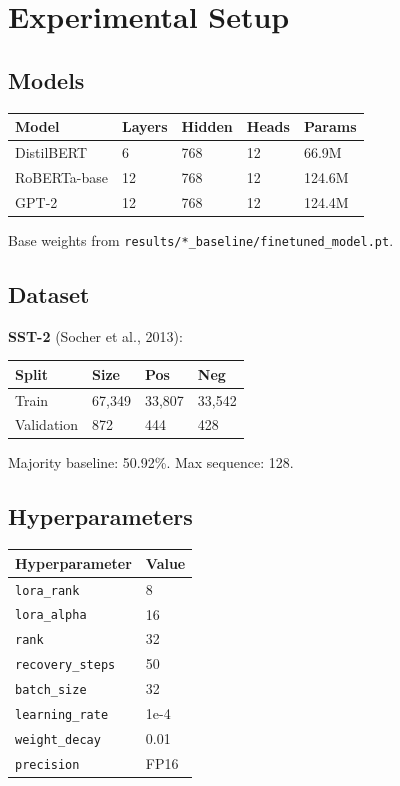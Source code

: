 \section{Experimental Setup}

\subsection{Models}

\begin{table}[H]
\centering
\small
\begin{tabular}{lllll}
\toprule
\textbf{Model} & \textbf{Layers} & \textbf{Hidden} & \textbf{Heads} & \textbf{Params} \\
\midrule
DistilBERT & 6 & 768 & 12 & 66.9M \\
RoBERTa-base & 12 & 768 & 12 & 124.6M \\
GPT-2 & 12 & 768 & 12 & 124.4M \\
\bottomrule
\end{tabular}
\end{table}

Base weights from \texttt{results/*\_baseline/finetuned\_model.pt}.

\subsection{Dataset}

\textbf{SST-2} (Socher et al., 2013):

\begin{table}[H]
\centering
\small
\begin{tabular}{llll}
\toprule
\textbf{Split} & \textbf{Size} & \textbf{Pos} & \textbf{Neg} \\
\midrule
Train & 67,349 & 33,807 & 33,542 \\
Validation & 872 & 444 & 428 \\
\bottomrule
\end{tabular}
\end{table}

Majority baseline: 50.92\%. Max sequence: 128.

\subsection{Hyperparameters}

\begin{table}[H]
\centering
\small
\begin{tabular}{ll}
\toprule
\textbf{Hyperparameter} & \textbf{Value} \\
\midrule
\texttt{lora\_rank} & 8 \\
\texttt{lora\_alpha} & 16 \\
\texttt{rank} & 32 \\
\texttt{recovery\_steps} & 50 \\
\texttt{batch\_size} & 32 \\
\texttt{learning\_rate} & 1e-4 \\
\texttt{weight\_decay} & 0.01 \\
\texttt{precision} & FP16 \\
\bottomrule
\end{tabular}
\end{table}

